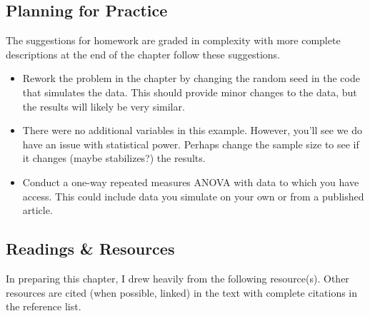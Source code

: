 \documentclass[
  11pt,
]{book}
\providecommand{\tightlist}{%
  \setlength{\itemsep}{0pt}\setlength{\parskip}{0pt}}
\begin{document}
\hypertarget{planning-for-practice-6}{%
\subsection{Planning for Practice}\label{planning-for-practice-6}}

The suggestions for homework are graded in complexity with more complete descriptions at the end of the chapter follow these suggestions.

\begin{itemize}
\tightlist
\item
  Rework the problem in the chapter by changing the random seed in the code that simulates the data. This should provide minor changes to the data, but the results will likely be very similar.
\item
  There were no additional variables in this example. However, you'll see we do have an issue with statistical power. Perhaps change the sample size to see if it changes (maybe stabilizes?) the results.
\item
  Conduct a one-way repeated measures ANOVA with data to which you have access. This could include data you simulate on your own or from a published article.
\end{itemize}

\hypertarget{readings-resources-6}{%
\subsection{Readings \& Resources}\label{readings-resources-6}}

In preparing this chapter, I drew heavily from the following resource(s). Other resources are cited (when possible, linked) in the text with complete citations in the reference list.
\end{document}
